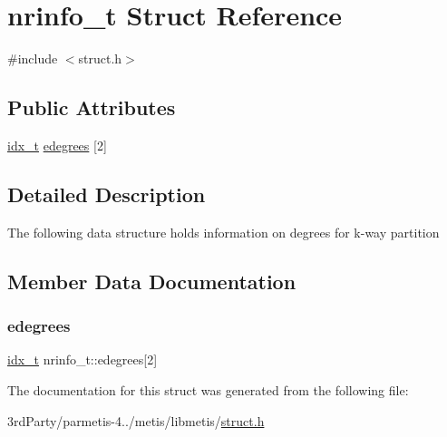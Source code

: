 \hypertarget{structnrinfo__t}{}\section{nrinfo\+\_\+t Struct Reference}
\label{structnrinfo__t}


{\ttfamily \#include $<$struct.\+h$>$}

\subsection*{Public Attributes}
\begin{DoxyCompactItemize}
\item 
\hyperlink{3rd_party_2parmetis-4_80_83_2metis_2include_2metis_8h_aaa5262be3e700770163401acb0150f52}{idx\+\_\+t} \hyperlink{structnrinfo__t_a39e2adc4b240da74c5b8b89007825ed1}{edegrees} \mbox{[}2\mbox{]}
\end{DoxyCompactItemize}


\subsection{Detailed Description}
The following data structure holds information on degrees for k-\/way partition 

\subsection{Member Data Documentation}
\mbox{\label{structnrinfo__t_a39e2adc4b240da74c5b8b89007825ed1}} 
\subsubsection{\texorpdfstring{edegrees}{edegrees}}
{\footnotesize\ttfamily \hyperlink{3rd_party_2parmetis-4_80_83_2metis_2include_2metis_8h_aaa5262be3e700770163401acb0150f52}{idx\+\_\+t} nrinfo\+\_\+t\+::edegrees\mbox{[}2\mbox{]}}



The documentation for this struct was generated from the following file\+:\begin{DoxyCompactItemize}
\item 
3rd\+Party/parmetis-\/4../metis/libmetis/\hyperlink{metis_2libmetis_2struct_8h}{struct.\+h}\end{DoxyCompactItemize}
